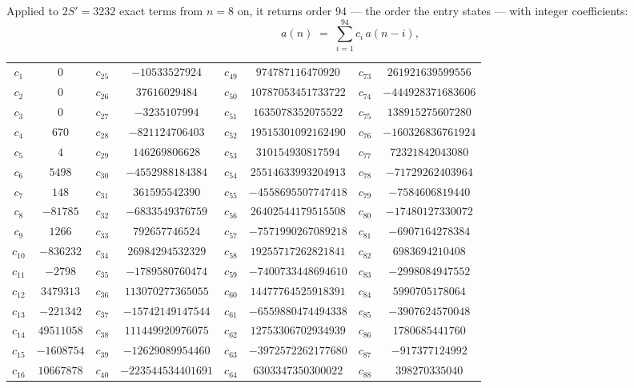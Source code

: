 \documentclass[11pt,a4paper]{article}
\theoremstyle{plain}
\theoremstyle{definition}
\begin{document}
Applied to $2S'=3232$ exact terms from $n=8$ on, it returns order $94$ --- the
order the entry states --- with integer coefficients:
\[
a(n)\;=\;\sum_{i=1}^{94}c_i\,a(n-i),
\]
\begin{center}\small
\begin{tabular}{cccccccc}
$c_{1}$ & $0$ & $c_{25}$ & $-10533527924$ & $c_{49}$ & $974787116470920$ & $c_{73}$ & $261921639599556$ \\
$c_{2}$ & $0$ & $c_{26}$ & $37616029484$ & $c_{50}$ & $10787053451733722$ & $c_{74}$ & $-444928371683606$ \\
$c_{3}$ & $0$ & $c_{27}$ & $-3235107994$ & $c_{51}$ & $1635078352075522$ & $c_{75}$ & $138915275607280$ \\
$c_{4}$ & $670$ & $c_{28}$ & $-821124706403$ & $c_{52}$ & $19515301092162490$ & $c_{76}$ & $-160326836761924$ \\
$c_{5}$ & $4$ & $c_{29}$ & $146269806628$ & $c_{53}$ & $310154930817594$ & $c_{77}$ & $72321842043080$ \\
$c_{6}$ & $5498$ & $c_{30}$ & $-4552988184384$ & $c_{54}$ & $25514633993204913$ & $c_{78}$ & $-71729262403964$ \\
$c_{7}$ & $148$ & $c_{31}$ & $361595542390$ & $c_{55}$ & $-4558695507747418$ & $c_{79}$ & $-7584606819440$ \\
$c_{8}$ & $-81785$ & $c_{32}$ & $-6833549376759$ & $c_{56}$ & $26402544179515508$ & $c_{80}$ & $-17480127330072$ \\
$c_{9}$ & $1266$ & $c_{33}$ & $792657746524$ & $c_{57}$ & $-7571990267089218$ & $c_{81}$ & $-6907164278384$ \\
$c_{10}$ & $-836232$ & $c_{34}$ & $26984294532329$ & $c_{58}$ & $19255717262821841$ & $c_{82}$ & $6983694210408$ \\
$c_{11}$ & $-2798$ & $c_{35}$ & $-1789580760474$ & $c_{59}$ & $-7400733448694610$ & $c_{83}$ & $-2998084947552$ \\
$c_{12}$ & $3479313$ & $c_{36}$ & $113070277365055$ & $c_{60}$ & $14477764525918391$ & $c_{84}$ & $5990705178064$ \\
$c_{13}$ & $-221342$ & $c_{37}$ & $-15742149147544$ & $c_{61}$ & $-6559880474494338$ & $c_{85}$ & $-3907624570048$ \\
$c_{14}$ & $49511058$ & $c_{38}$ & $111449920976075$ & $c_{62}$ & $12753306702934939$ & $c_{86}$ & $1780685441760$ \\
$c_{15}$ & $-1608754$ & $c_{39}$ & $-12629089954460$ & $c_{63}$ & $-3972572262177680$ & $c_{87}$ & $-917377124992$ \\
$c_{16}$ & $10667878$ & $c_{40}$ & $-223544534401691$ & $c_{64}$ & $6303347350300022$ & $c_{88}$ & $398270335040$ \\

\end{tabular}
\end{center}
\end{document}
